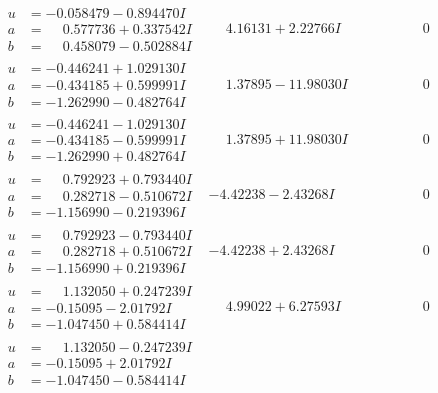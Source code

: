 \documentclass[1p]{elsarticle_modified}
\theoremstyle{definition}
\begin{document}
$$\begin{array}{c|c|c}
\begin{aligned}
u &= -0.058479 - 0.894470 I \\
a &= \phantom{-}0.577736 + 0.337542 I \\
b &= \phantom{-}0.458079 - 0.502884 I\end{aligned}
 & \phantom{-}4.16131 + 2.22766 I & \phantom{-0.000000 } 0 \\ \hline\begin{aligned}
u &= -0.446241 + 1.029130 I \\
a &= -0.434185 + 0.599991 I \\
b &= -1.262990 - 0.482764 I\end{aligned}
 & \phantom{-}1.37895 - 11.98030 I & \phantom{-0.000000 } 0 \\ \hline\begin{aligned}
u &= -0.446241 - 1.029130 I \\
a &= -0.434185 - 0.599991 I \\
b &= -1.262990 + 0.482764 I\end{aligned}
 & \phantom{-}1.37895 + 11.98030 I & \phantom{-0.000000 } 0 \\ \hline\begin{aligned}
u &= \phantom{-}0.792923 + 0.793440 I \\
a &= \phantom{-}0.282718 - 0.510672 I \\
b &= -1.156990 - 0.219396 I\end{aligned}
 & -4.42238 - 2.43268 I & \phantom{-0.000000 } 0 \\ \hline\begin{aligned}
u &= \phantom{-}0.792923 - 0.793440 I \\
a &= \phantom{-}0.282718 + 0.510672 I \\
b &= -1.156990 + 0.219396 I\end{aligned}
 & -4.42238 + 2.43268 I & \phantom{-0.000000 } 0 \\ \hline\begin{aligned}
u &= \phantom{-}1.132050 + 0.247239 I \\
a &= -0.15095 - 2.01792 I \\
b &= -1.047450 + 0.584414 I\end{aligned}
 & \phantom{-}4.99022 + 6.27593 I & \phantom{-0.000000 } 0 \\ \hline\begin{aligned}
u &= \phantom{-}1.132050 - 0.247239 I \\
a &= -0.15095 + 2.01792 I \\
b &= -1.047450 - 0.584414 I\end{aligned}

\end{array}$$
\end{document}
